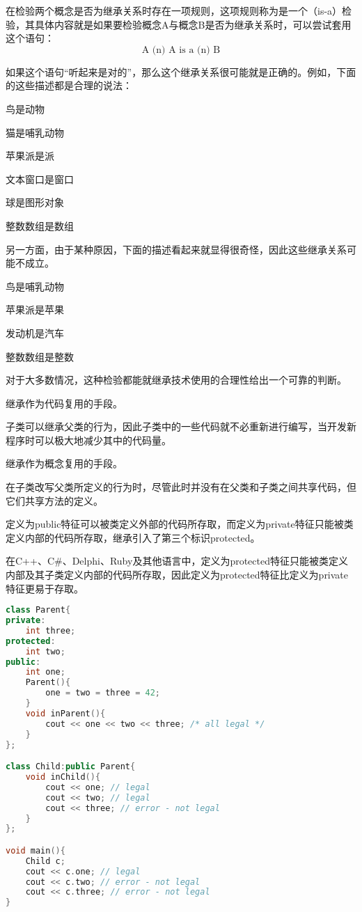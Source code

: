在检验两个概念是否为继承关系时存在一项规则，这项规则称为是一个（is-a）检验，其具体内容就是如果要检验概念A与概念B是否为继承关系时，可以尝试套用这个语句：
\[\mbox{A (n) A is a (n) B}\]

如果这个语句“听起来是对的”，那么这个继承关系很可能就是正确的。例如，下面的这些描述都是合理的说法：

\begin{compactenum}
\item 鸟是动物
\item 猫是哺乳动物
\item 苹果派是派
\item 文本窗口是窗口
\item 球是图形对象
\item 整数数组是数组
\end{compactenum}

另一方面，由于某种原因，下面的描述看起来就显得很奇怪，因此这些继承关系可能不成立。

\begin{compactenum}
\item 鸟是哺乳动物
\item 苹果派是苹果
\item 发动机是汽车
\item 整数数组是整数
\end{compactenum}

对于大多数情况，这种检验都能就继承技术使用的合理性给出一个可靠的判断。

\begin{compactitem}
\item 继承作为代码复用的手段。

子类可以继承父类的行为，因此子类中的一些代码就不必重新进行编写，当开发新程序时可以极大地减少其中的代码量。

\item 继承作为概念复用的手段。

在子类改写父类所定义的行为时，尽管此时并没有在父类和子类之间共享代码，但它们共享方法的定义。
\end{compactitem}

定义为public特征可以被类定义外部的代码所存取，而定义为private特征只能被类定义内部的代码所存取，继承引入了第三个标识protected。

在C++、C\#、Delphi、Ruby及其他语言中，定义为protected特征只能被类定义内部及其子类定义内部的代码所存取，因此定义为protected特征比定义为private特征更易于存取。



\begin{lstlisting}[language=C++]
class Parent{
private:
	int three;
protected:
	int two;
public:
	int one;
	Parent(){
		one = two = three = 42;
	}
	void inParent(){
		cout << one << two << three; /* all legal */ 
	}
};

class Child:public Parent{
	void inChild(){
		cout << one; // legal
		cout << two; // legal
		cout << three; // error - not legal
	}
};

void main(){
	Child c;
	cout << c.one; // legal
	cout << c.two; // error - not legal
	cout << c.three; // error - not legal
}
\end{lstlisting}

